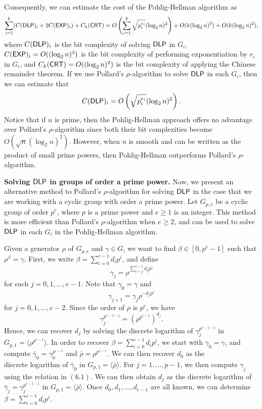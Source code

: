 \newpage 
Consequently, we can estimate the cost of the Pohlig-Hellman algorithm as 
\[ \sum_{i=1}^k (C({\sf DLP})_i + 2C({\sf EXP})_i) + C_k({\sf CRT}) = 
O \left( \sum_{i=1}^k \sqrt{p_i^{e_i}} (\log_2 n)^2 \right) + 
O(k(\log_2 n)^3) + O(k(\log_2 n)^2), \] 
where $C({\sf DLP})_i$ is the bit complexity of solving ${\sf DLP}$ in $G_i$, 
$C({\sf EXP})_i = O((\log_2 n)^3)$ is the bit complexity of performing exponentiation 
by $r_i$ in $G_i$, and $C_k({\sf CRT}) = O((\log_2 n)^2)$ is the bit complexity of 
applying the Chinese remainder theorem. If we use Pollard's $\rho$-algorithm 
to solve ${\sf DLP}$ in each $G_i$, then we can estimate that 
\[ C({\sf DLP})_i = O\left( \sqrt{p_i^{e_i}} (\log_2 n)^2 \right). \] 
Notice that if $n$ is prime, then the Pohlig-Hellman approach offers no advantage 
over Pollard's $\rho$-algorithm since both their bit complexities become 
$O(\sqrt n (\log_2 n)^2)$. However, when $n$ is smooth and can be written as 
the product of small prime powers, then Pohlig-Hellman outperforms Pollard's 
$\rho$-algorithm.

{\bf Solving ${\sf DLP}$ in groups of order a prime power.} Now, we present 
an alternative method to Pollard's $\rho$-algorithm for solving ${\sf DLP}$ in the 
case that we are working with a cyclic group with order a prime power. 
Let $G_{p,e}$ be a cyclic group of order $p^e$, where $p$ is a prime power and 
$e \geq 1$ is an integer. This method is more efficient than Pollard's 
$\rho$-algorithm when $e \geq 2$, and can be used to solve ${\sf DLP}$ in each $G_i$ 
in the Pohlig-Hellman algorithm. 

Given a generator $\rho$ of $G_{p,e}$ and $\gamma \in G$, we want to find 
$\beta \in [0, p^e - 1]$ such that $\rho^\beta = \gamma$. First, we write 
$\beta = \sum_{i=0}^{e-1} d_i p^i$, and define 
\[ \gamma_j = \rho^{\sum_{i=j}^{e-1} d_j p^j} \] 
for each $j = 0, 1, \dots, e-1$. Note that $\gamma_0 = \gamma$ and 
\begin{equation} \gamma_{j+1} = \gamma_j \rho^{-d_j p^j} \end{equation}
for $j = 0, 1, \dots, e-2$. Since the order of $\rho$ is $p^e$, we have 
\[ \gamma_j^{p^{e-1-j}} = \left( \rho^{p^{e-1}} \right)^{d_j}. \] 
Hence, we can recover $d_j$ by solving the discrete logarithm of 
$\gamma_j^{p^{e-1-j}}$ in $G_{p,1} = \langle \rho^{p^{e-1}} \rangle$. In order 
to recover $\beta = \sum_{i=0}^{e-1} d_i p^i$, we start with $\gamma_0 = \gamma$,
and compute $\bar\gamma_0 = \gamma_0^{p^{e-1}}$ and $\bar\rho = 
\rho^{p^{e-1}}$. We can then recover $d_0$ as the \\[4pt] discrete logarithm of 
$\bar\gamma_0$ in $G_{p,1} = \langle \bar\rho \rangle$. For $j = 1, \dots, p-1$, 
we then compute $\gamma_j$ using the relation in $(6.1)$. We can then obtain 
$d_j$ as the discrete logarithm of $\bar\gamma_j = \gamma_j^{p^{e-1-j}}$ in 
$G_{p,1} = \langle \bar\rho \rangle$. Once $d_0, d_1, \dots, d_{e-1}$ are 
all known, we can determine $\beta = \sum_{i=0}^{e-1} d_i p^i$. 

